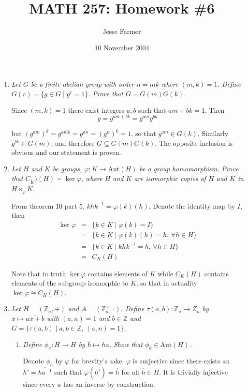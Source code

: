 \documentclass[letterpaper, 11pt]{article}
\title{MATH 257: Homework \#6}
\author{Jesse Farmer}
\date{10 November 2004}
\newcommand{\Aut}{\text{Aut}}
\newcommand{\Z}{\mathbb{Z}}
\begin{document}
\maketitle
\begin{enumerate}
\item \emph{Let $G$ be a finite abelian group with order $n=mk$ where $(m,k)=1$.  Define $G(r) = \{g \in G \mid g^r = 1\}$.  Prove that $G=G(m)G(k)$.}

Since $(m,k) = 1$ there exist integers $a,b$ such that $am + bk = 1$.  Then
\[
g = g^{am+bk} = g^{am}g^{bk}
\]

but $\left(g^{am}\right)^k = g^{amk} = g^{an} = \left(g^n\right)^k = 1$, so that $g^{am} \in G(k)$.  Similarly $g^{bk} \in G(m)$, and therefore $G \subseteq G(m)G(k)$.  The opposite inclusion is obvious and our statement is proven.

\item \emph{Let $H$ and $K$ be groups, $\varphi: K \rightarrow \Aut(H)$ be a group homomorphism.  Prove that $C_{\tilde{K}})(H) = \ker \varphi$, where $H$ and $K$ are isomorphic copies of $H$ and $K$ in $H \rtimes_{\varphi} K$.}

From theorem 10 part 5, $khk^{-1} = \varphi(k)(h)$.  Denote the identity map by $I$, then
\begin{eqnarray*}
\ker \varphi &=& \{k \in K \mid \varphi(k) = I\} \\ 
&=& \{k \in K \mid \varphi(k)(h) = h,\, \forall h \in H\} \\
&=& \{k \in K \mid khk^{-1} = h,\, \forall h \in H \} \\
&=& C_K(H)
\end{eqnarray*}

Note that in truth $\ker \varphi$ contains elements of $K$ while $C_K(H)$ contains elements of the subgroup isomorphic to $K$, so that in actuality $\ker \varphi \cong C_K(H)$.

\item \emph{Let $H = (\Z_n,+)$ and $A = (\Z_n^{\times},\cdot)$.  Define $\tau(a,b): \Z_n \rightarrow Z_n$ by $\overline{x} \mapsto \overline{ax+b}$ with $(a,n) = 1$ and $b \in \Z$ and $G = \{\tau(a,b) \mid a,b \in \Z,\,(a,n)=1\}$.}
\begin{enumerate}
\item \emph{Define $\phi_{\overline{a}}: H \rightarrow H$ by $\overline{h} \mapsto \overline{ha}$.  Show that $\phi_{\overline{a}} \in \Aut(H)$.}

Denote $\phi_{\overline{a}}$ by $\varphi$ for brevity's sake.  $\varphi$ is surjective since there exists an $\overline{h'} = \overline{ha^{-1}}$ such that $\varphi\left(\overline{h'}\right) = \overline{h}$ for all $\overline{h} \in H$.  It is trivially injective since every $a$ has an inverse by construction.


\end{enumerate}
\end{enumerate}
\end{document}
